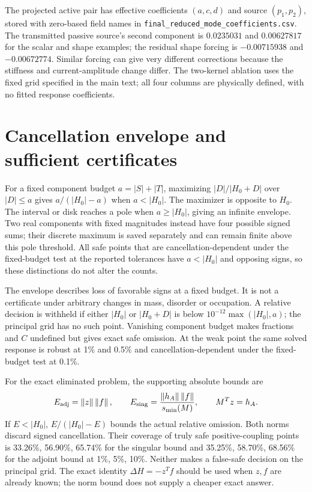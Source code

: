 \documentclass[11pt]{article}
\newcommand{\norm}[1]{\left\lVert#1\right\rVert}
\begin{document}
The projected active pair has effective coefficients $(a,c,d)$ and source $(p_1,p_2)$, stored with zero-based field names in \nolinkurl{final_reduced_mode_coefficients.csv}. The transmitted passive source's second component is $0.0235031$ and $0.00627817$ for the scalar and shape examples; the residual shape forcing is $-0.00715938$ and $-0.00672774$. Similar forcing can give very different corrections because the stiffness and current-amplitude change differ. The two-kernel ablation uses the fixed grid specified in the main text; all four columns are physically defined, with no fitted response coefficients.

\section{Cancellation envelope and sufficient certificates}
For a fixed component budget $a=|S|+|T|$, maximizing $|D|/|H_0+D|$ over $|D|\leq a$ gives $a/(|H_0|-a)$ when $a<|H_0|$. The maximizer is opposite to $H_0$. The interval or disk reaches a pole when $a\geq|H_0|$, giving an infinite envelope. Two real components with fixed magnitudes instead have four possible signed sums; their discrete maximum is saved separately and can remain finite above this pole threshold. All safe points that are cancellation-dependent under the fixed-budget test at the reported tolerances have $a<|H_0|$ and opposing signs, so these distinctions do not alter the counts.

The envelope describes loss of favorable signs at a fixed budget. It is not a certificate under arbitrary changes in mass, disorder or occupation. A relative decision is withheld if either $|H_0|$ or $|H_0+D|$ is below $10^{-12}\max(|H_0|,a)$; the principal grid has no such point. Vanishing component budget makes fractions and $C$ undefined but gives exact safe omission. At the weak point the same solved response is robust at 1\% and 0.5\% and cancellation-dependent under the fixed-budget test at 0.1\%.

For the exact eliminated problem, the supporting absolute bounds are
\begin{equation}
E_{\rm adj}=\norm z\norm f,\qquad
E_{\rm sing}=\frac{\norm{h_A}\norm f}{s_{\min}(M)},\qquad M^Tz=h_A.
\end{equation}
If $E<|H_0|$, $E/(|H_0|-E)$ bounds the actual relative omission. Both norms discard signed cancellation. Their coverage of truly safe positive-coupling points is 33.26\%, 56.90\%, 65.74\% for the singular bound and 35.25\%, 58.70\%, 68.56\% for the adjoint bound at 1\%, 5\%, 10\%. Neither makes a false-safe decision on the principal grid. The exact identity $\Delta H=-z^Tf$ should be used when $z,f$ are already known; the norm bound does not supply a cheaper exact answer.
\end{document}
